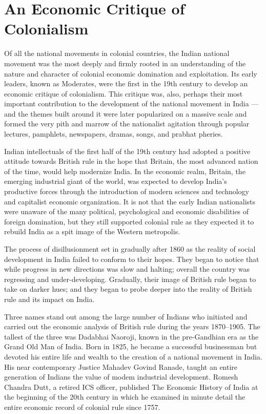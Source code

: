 \chapter{An Economic Critique of Colonialism}
\begin{multicols}{2}

Of all the national movements in colonial countries, the Indian national movement was the most deeply and firmly rooted in an understanding of the nature and character of colonial economic domination and exploitation. Its early leaders, known as Moderates, were the first in the 19th century to develop an economic critique of colonialism. This critique was, also, perhaps their most important contribution to the development of the national movement in India --- and the themes built around it were later popularized on a massive scale and formed the very pith and marrow of the nationalist agitation through popular lectures, pamphlets, newspapers, dramas, songs, and prabhat pheries.

Indian intellectuals of the first half of the 19th century had adopted a positive attitude towards British rule in the hope that Britain, the most advanced nation of the time, would help modernize India. In the economic realm, Britain, the emerging industrial giant of the world, was expected to develop India's productive forces through the introduction of modern sciences and technology and capitalist economic organization. It is not that the early Indian nationalists were unaware of the many political, psychological and economic disabilities of foreign domination, but they still supported colonial rule as they expected it to rebuild India as a spit image of the Western metropolis.

The process of disillusionment set in gradually after 1860 as the reality of social development in India failed to conform to their hopes. They began to notice that while progress in new directions was slow and halting; overall the country was regressing and under-developing. Gradually, their image of British rule began to take on darker hues; and they began to probe deeper into the reality of British rule and its impact on India.

Three names stand out among the large number of Indians who initiated and carried out the economic analysis of British rule during the years 1870--1905. The tallest of the three was Dadabhai Naoroji, known in the pre-Gandhian era as the Grand Old Man of India. Born in 1825, he became a successful businessman but devoted his entire life and wealth to the creation of a national movement in India. His near contemporary Justice Mahadev Govind Ranade, taught an entire generation of Indians the value of modem industrial development. Romesh Chandra Dutt, a retired ICS officer, published The Economic History of India at the beginning of the 20th century in which he examined in minute detail the entire economic record of colonial rule since 1757.


\end{multicols}

